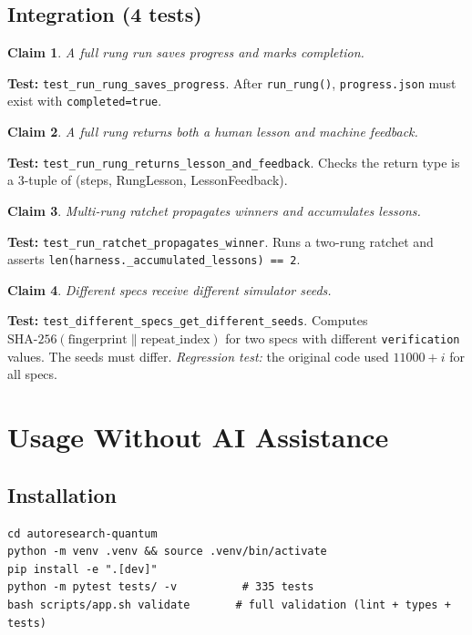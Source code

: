 \documentclass[11pt,a4paper]{article}
\newtheorem{claim}{Claim}[section]
\newcommand{\code}[1]{\texttt{#1}}
\begin{document}
\subsection{Integration (4 tests)}

\begin{claim}
\label{claim:rung_progress}
A full rung run saves progress and marks completion.
\end{claim}
\textbf{Test:} \code{test\_run\_rung\_saves\_progress}. After
\code{run\_rung()}, \code{progress.json} must exist with
\code{completed=true}.

\begin{claim}
\label{claim:rung_lesson}
A full rung returns both a human lesson and machine feedback.
\end{claim}
\textbf{Test:} \code{test\_run\_rung\_returns\_lesson\_and\_feedback}. Checks
the return type is a 3-tuple of (steps, RungLesson, LessonFeedback).

\begin{claim}
\label{claim:propagation}
Multi-rung ratchet propagates winners and accumulates lessons.
\end{claim}
\textbf{Test:} \code{test\_run\_ratchet\_propagates\_winner}. Runs a two-rung
ratchet and asserts \code{len(harness.\_accumulated\_lessons) == 2}.

\begin{claim}
\label{claim:seed}
Different specs receive different simulator seeds.
\end{claim}
\textbf{Test:} \code{test\_different\_specs\_get\_different\_seeds}. Computes
$\text{SHA-256}(\text{fingerprint} \| \text{repeat\_index})$ for two specs
with different \code{verification} values. The seeds must differ.
\emph{Regression test:} the original code used $11000 + i$ for all specs.

\section{Usage Without AI Assistance}
\label{sec:usage}

\subsection{Installation}

\begin{lstlisting}[style=shell]
cd autoresearch-quantum
python -m venv .venv && source .venv/bin/activate
pip install -e ".[dev]"
python -m pytest tests/ -v          # 335 tests
bash scripts/app.sh validate       # full validation (lint + types + tests)
\end{lstlisting}
\end{document}
